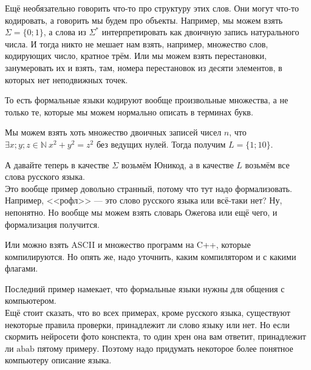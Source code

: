 \documentclass{article}
\begin{document}
\begin{itemize}
\begin{Example}
        \end{Example}
        \begin{Example}
            Ещё необязательно говорить что-то про структуру этих слов. Они могут что-то кодировать, а говорить мы будем про объекты. Например, мы можем взять $\Sigma=\{0;1\}$, а слова из $\Sigma^*$ интерпретировать как двоичную запись натурального числа. И тогда никто не мешает нам взять, например, множество слов, кодирующих число, кратное трём. Или мы можем взять перестановки, занумеровать их и взять, там, номера перестановок из десяти элементов, в которых нет неподвижных точек.
        \end{Example}
        \begin{Comment}
            То есть формальные языки кодируют вообще произвольные множества, а не только те, которые мы можем нормально описать в терминах букв.
        \end{Comment}
        \begin{Example}
            Мы можем взять хоть множество двоичных записей чисел $n$, что $\exists x;y;z\in\mathbb N~x^2+y^2=z^2$ без ведущих нулей. Тогда получим $L=\{1;10\}$.
        \end{Example}
        \begin{Example}
            А давайте теперь в качестве $\Sigma$ возьмём Юникод, а в качестве $L$ возьмём все слова русского языка.\\
            Это вообще пример довольно странный, потому что тут надо формализовать. Например, <<рофл>> --- это слово русского языка или всё-таки нет? Ну, непонятно. Но вообще мы можем взять словарь Ожегова или ещё чего, и формализация получится.
        \end{Example}
        \begin{Example}
            Или можно взять ASCII и множество программ на C++, которые компилируются. Но опять же, надо уточнить, каким компилятором и с какими флагами.
        \end{Example}
        \pagebreak
        \begin{Comment}
            Последний пример намекает, что формальные языки нужны для общения с компьютером.\\
            Ещё стоит сказать, что во всех примерах, кроме русского языка, существуют некоторые правила проверки, принадлежит ли слово языку или нет. Но если скормить нейросети фото конспекта, то один хрен она вам ответит, принадлежит ли $\mathrm{abab}$ пятому примеру. Поэтому надо придумать некоторое более понятное компьютеру описание языка.\\

\end{Comment}
\end{itemize}
\end{document}
